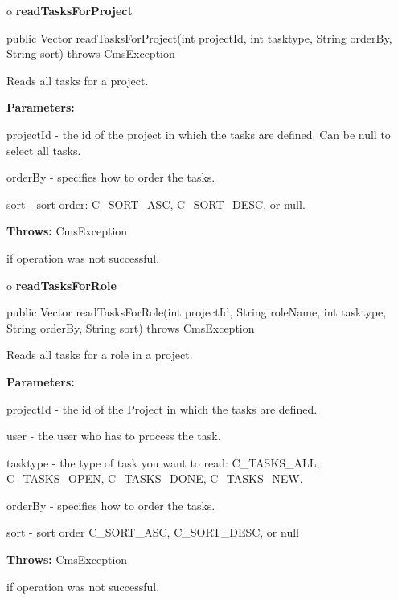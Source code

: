 o {\bf readTasksForProject} 

\begin{PRE}
 public Vector readTasksForProject(int projectId,
                                   int tasktype,
                                   String orderBy,
                                   String sort) throws CmsException
\end{PRE}

\begin{description}
\htmlDD Reads all tasks for a project. 

\begin{description}
\item {\bf Parameters:}  

projectId - the id of the project in which the tasks are defined. Can be null
to select all tasks.  

orderBy - specifies how to order the tasks.  

sort - sort order: C\_SORT\_ASC, C\_SORT\_DESC, or null.  
\item {\bf Throws:} CmsException  

if operation was not successful.  
\end{description}

\end{description}

o {\bf readTasksForRole} 

\begin{PRE}
 public Vector readTasksForRole(int projectId,
                                String roleName,
                                int tasktype,
                                String orderBy,
                                String sort) throws CmsException
\end{PRE}

\begin{description}
\htmlDD Reads all tasks for a role in a project. 

\begin{description}
\item {\bf Parameters:}  

projectId - the id of the Project in which the tasks are defined.  

user - the user who has to process the task.  

tasktype - the type of task you want to read: C\_TASKS\_ALL, C\_TASKS\_OPEN,
C\_TASKS\_DONE, C\_TASKS\_NEW.  

orderBy - specifies how to order the tasks.  

sort - sort order C\_SORT\_ASC, C\_SORT\_DESC, or null  
\item {\bf Throws:} CmsException  

if operation was not successful.  
\end{description}

\end{description}

